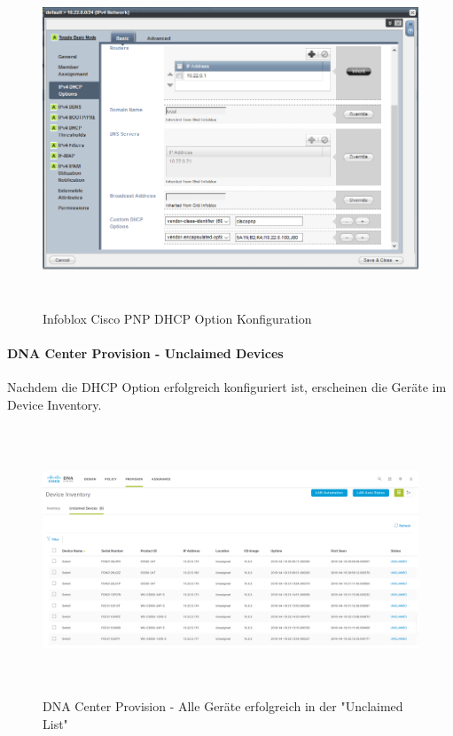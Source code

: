 \begin{figure}[H]
	\centering
	\includegraphics[height=10cm]{img/Infoblox_PNP.png}
	\caption{Infoblox Cisco PNP DHCP Option Konfiguration}
	\label{fig:cisco-pnp}
\end{figure}

\paragraph{DNA Center Provision - Unclaimed Devices}
Nachdem die DHCP Option erfolgreich konfiguriert ist, erscheinen die Geräte im Device Inventory.

\begin{figure}[H]
	\centering
	\includegraphics[height=8cm]{img/DNA_Center_All_Fabric2_Unclaimed.PNG}
	\caption{DNA Center Provision - Alle Geräte erfolgreich in der "Unclaimed List"}
	\label{fig:dna-center-provision-unclaimed}
\end{figure}

